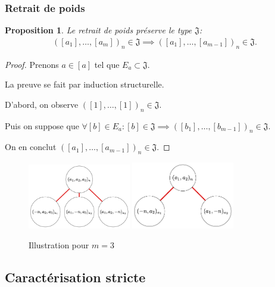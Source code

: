 \documentclass{article}
\newtheorem{proposition}{Proposition}
\newcommand{\J}{\mathfrak{J}}
\begin{document}
\subsubsection{Retrait de poids}

\begin{proposition}
    Le retrait de poids préserve le type $\J$:
    \begin{align*}
        {([a_1], \dots, [a_m])}_n \in \J \implies {([a_1], \dots, [a_{m-1}])}_n \in \J.
    \end{align*}
\end{proposition}

\begin{proof}
    Prenons $a \in [a]$ tel que $E_a \subset \J$.

    La preuve se fait par induction structurelle.

    D'abord, on observe ${([1], \dots, [1])}_n \in \J$.

    Puis on suppose que $\forall [b] \in E_a : [b] \in \J \implies {([b_1], \dots, [b_{m-1}])}_n \in \J$.

    On en conclut ${([a_1], \dots, [a_{m-1}])}_n \in \J$.
\end{proof}

\begin{figure}[h]
    \caption{Illustration pour $m = 3$}
    \centering
    \includegraphics[width=0.4\textwidth]{abcn}
    \includegraphics[width=0.4\textwidth]{abn}
\end{figure}

\newpage

\subsection{Caractérisation stricte}
\end{document}
